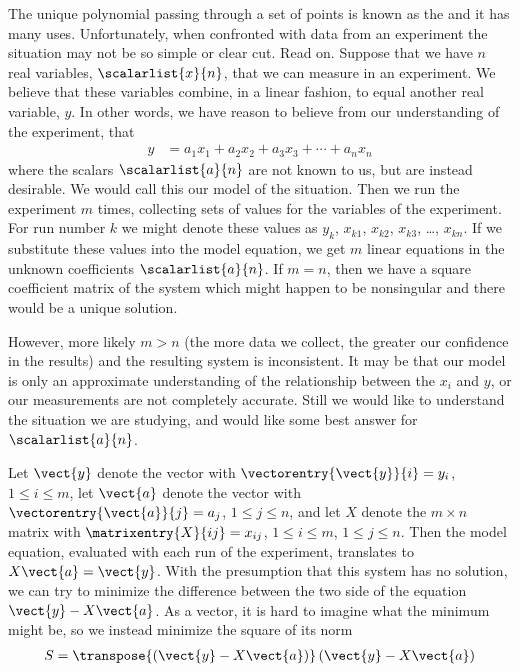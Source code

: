 %
The unique polynomial passing through a set of points is known as the  and it has many uses.  Unfortunately, when confronted with data from an experiment the situation may not be so simple or clear cut.  Read on.
%
%
Suppose that we have $n$ real variables, $\scalarlist{x}{n}$, that we can measure in an experiment.  We believe that these variables combine, in a linear fashion, to equal another real variable, $y$.  In other words, we have reason to believe from our understanding of the experiment, that
%
\begin{align*}
y&=a_1x_1+a_2x_2+a_3x_3+\cdots+a_nx_n
\end{align*}
%
where the scalars $\scalarlist{a}{n}$ are not known to us, but are instead desirable.  We would call this our model of the situation.  Then we run the experiment $m$ times, collecting sets of values for the variables of the experiment.  For run number $k$ we might denote these values as $y_k$, $x_{k1}$, $x_{k2}$, $x_{k3}$, \dots, $x_{kn}$.  If we substitute these values into the model equation, we get $m$ linear equations in the unknown coefficients $\scalarlist{a}{n}$.  If $m=n$, then we have a square coefficient matrix of the system which might happen to be nonsingular and there would be a unique solution.\par
%
However, more likely $m>n$ (the more data we collect, the greater our confidence in the results) and the resulting system is inconsistent.  It may be that our model is only an approximate understanding of the relationship between the $x_i$ and $y$, or our measurements are not completely accurate.  Still we would like to understand the situation we are studying, and would like some best answer for $\scalarlist{a}{n}$.\par
%
Let $\vect{y}$ denote the vector with $\vectorentry{\vect{y}}{i}=y_i$, $1\leq i\leq m$, let $\vect{a}$ denote the vector with $\vectorentry{\vect{a}}{j}=a_j$, $1\leq j\leq n$, and let $X$ denote the $m\times n$ matrix with $\matrixentry{X}{ij}=x_{ij}$, $1\leq i\leq m$, $1\leq j\leq n$.  Then the model equation, evaluated with each run of the experiment, translates to $X\vect{a}=\vect{y}$.  With the presumption that this system has no solution, we can try to minimize the difference between the two side of the equation $\vect{y}-X\vect{a}$.  As a vector, it is hard to imagine what the minimum might be, so we instead minimize the square of its norm 
%
\begin{align*}
S=\transpose{\left(\vect{y}-X\vect{a}\right)}\left(\vect{y}-X\vect{a}\right)
\end{align*}
